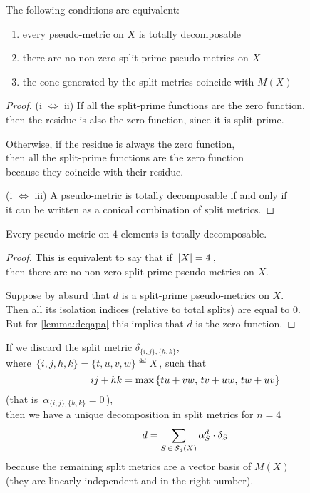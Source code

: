 \documentclass[./main.tex]{subfiles}
\begin{document}
\begin{proposition}
    The following conditions are equivalent:
    \begin{enumerate}[label=(\roman*)]
        \item every pseudo-metric on $X$ is totally decomposable
        \item there are no non-zero split-prime pseudo-metrics on $X$
        \item the cone generated by the split metrics coincide with $M(X)$
    \end{enumerate}
\end{proposition}
\begin{proof}
    (i $\Leftrightarrow$ ii) If all the split-prime functions are the zero function, \\
    \bsp then the residue is also the zero function, since it is split-prime.
    
    Otherwise, if the residue is always the zero function, \\
    \bsp then all the split-prime functions are the zero function \\
    \bsp because they coincide with their residue. \bigskip

    (i $\Leftrightarrow$ iii) A pseudo-metric is totally decomposable if and only if \\
    \bsp it can be written as a conical combination of split metrics.
\end{proof}

\begin{proposition} \label{prop:4totd}
    Every pseudo-metric on $4$ elements is totally decomposable.
\end{proposition}
\begin{proof}
    This is equivalent to say that if $\, \left\lvert X\right\rvert = 4 \,$, \\
    \bsp then there are no non-zero split-prime pseudo-metrics on $X$.

    Suppose by absurd that $d$ is a split-prime pseudo-metrics on $X$. \\
    Then all its isolation indices (relative to total splits) are equal to $0$. \\
    But for \autoref{lemma:deqapa} this implies that $d$ is the zero function.
\end{proof}

\clearpage

\begin{remark}
    If we discard the split metric $\delta_{\{i,j\},\{h,k\}}$, \\[2pt]
    where $\, \{i,j,h,k\} = \{t,u,v,w\} \eqdef X \,$, such that
    \[ ij + hk = \max {\{ tu + vw,\, tv + uw,\, tw + uv \}} \eqspace{0pt}{-2pt} \]
    \bsp (that is $\, \alpha_{\{i,j\},\{h,k\}} = 0 \,$), \\[3pt]
    then we have a unique decomposition in split metrics for $n = 4$
    \[ d = \sum_{S \,\in\, {\mathcal{S}}_d(X)} \alpha_S^d \cdot \delta_S \]
    because the remaining split metrics are a vector basis of $M(X)$ \\
    \bsp (they are linearly independent and in the right number).
\end{remark}
\end{document}
